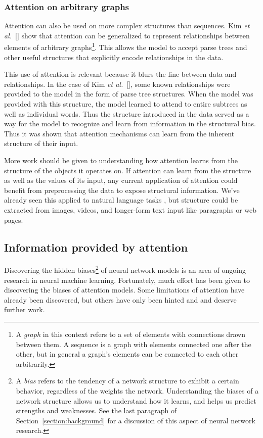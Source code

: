 \documentclass{article}
\newcommand{\etal}{\textit{et al.}}
\begin{document}
\subsubsection{Attention on arbitrary graphs}

Attention can also be used on more complex structures than sequences. Kim \etal~[\citeyear{graphs}] show that attention can be generalized to represent relationships between elements of arbitrary graphs\footnote{A \textit{graph} in this context refers to a set of elements with connections drawn between them. A sequence is a graph with elements connected one after the other, but in general a graph's elements can be connected to each other arbitrarily.}. This allows the model to accept parse trees and other useful structures that explicitly encode relationships in the data.

This use of attention is relevant because it blurs the line between data and relationships. In the case of Kim \etal~[\citeyear{graphs}], some known relationships were provided to the model in the form of parse tree structures. When the model was provided with this structure, the model learned to attend to entire subtrees as well as individual words. Thus the structure introduced in the data served as a way for the model to recognize and learn from information in the structural bias. Thus it was shown that attention mechanisms can learn from the inherent structure of their input.

More work should be given to understanding how attention learns from the structure of the objects it operates on. If attention can learn from the structure as well as the values of its input, any current application of attention could benefit from preprocessing the data to expose structural information. We've already seen this applied to natural language tasks \cite{graphs}, but structure could be extracted from images, videos, and longer-form text input like paragraphs or web pages.

\subsection{Information provided by attention}

Discovering the hidden biases\footnote{A \textit{bias} refers to the tendency of a network structure to exhibit a certain behavior, regardless of the weights the network. Understanding the biases of a network structure allows us to understand how it learns, and helps us predict strengths and weaknesses. See the last paragraph of Section~\ref{section:background} for a discussion of this aspect of neural network research.} of neural network models is an area of ongoing research in neural machine learning. Fortunately, much effort has been given to discovering the biases of attention models. Some limitations of attention have already been discovered, but others have only been hinted and and deserve further work.
\end{document}
